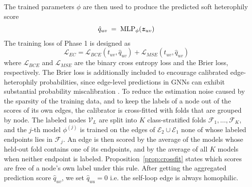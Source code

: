 The trained parameters $\phi$ are then used to produce the predicted soft heterophily score
\begin{equation}
  \hat{q}_{uv} \;=\; \text{MLP}_\phi(\bm{z}_{uv})
  \label{eq:quvfromphi}
\end{equation}
The training loss of Phase 1 is designed as
\begin{equation}
    \mathcal{L}_{EC} = \mathcal{L}_{BCE}(t_{uv}, \hat{q}_{uv}) +   \mathcal{L}_{MSE}(t_{uv}, \hat{q}_{uv})
    \label{eq:LossEC}
\end{equation}
where $\mathcal{L}_{BCE}$ and $\mathcal{L}_{MSE}$ are the binary cross entropy loss and the Brier loss, respectively.
The Brier loss is additionally included to encourage calibrated edge-heterophily probabilities, since edge-level predictions in GNNs can exhibit substantial probability miscalibration \citep{nascimento2024innout}.
To reduce the estimation noise caused by the sparsity of the training data, and to keep the labels of a node out of the scores of its own edges, the calibrator is cross-fitted with folds that are grouped by node.
The labeled nodes $\mathcal{V}_L$ are split into $K$ class-stratified folds $\mathcal{F}_1,\dots,\mathcal{F}_K$, and the $j$-th model $\phi^{(j)}$ is trained on the edges of $\mathcal{E}_2\cup\mathcal{E}_1$ none of whose labeled endpoints lies in $\mathcal{F}_j$.
An edge is then scored by the average of the models whose held-out fold contains one of its endpoints, and by the average of all $K$ models when neither endpoint is labeled.
Proposition~\ref{prop:crossfit} states which scores are free of a node's own label under this rule.
After getting the aggregated prediction score $\hat{q}_{uv}$, we set $\hat{q}_{uu} = 0$ i.e. the self-loop edge is always homophilic.
